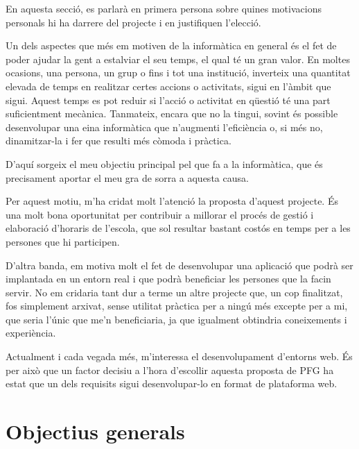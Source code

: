 \documentclass[a4paper,12pt]{ThesisStyle}
\begin{document}
En aquesta secció, es parlarà en primera persona sobre quines motivacions personals hi ha darrere del projecte i en justifiquen l'elecció.

Un dels aspectes que més em motiven de la informàtica en general és el fet de poder ajudar la gent a estalviar el seu temps, el qual té un gran valor. En moltes ocasions, una persona, un grup o fins i tot una institució, inverteix una quantitat elevada de temps en realitzar certes accions o activitats, sigui en l'àmbit que sigui. Aquest temps es pot reduir si l'acció o activitat en qüestió té una part suficientment mecànica. Tanmateix, encara que no la tingui, sovint és possible desenvolupar una eina informàtica que n'augmenti l'eficiència o, si més no, dinamitzar-la i fer que resulti més còmoda i pràctica.

D'aquí sorgeix el meu objectiu principal pel que fa a la informàtica, que és precisament aportar el meu gra de sorra a aquesta causa.

Per aquest motiu, m'ha cridat molt l'atenció la proposta d'aquest projecte. És una molt bona oportunitat per contribuir a millorar el procés de gestió i elaboració d'horaris de l'escola, que sol resultar bastant costós en temps per a les persones que hi participen.

D'altra banda, em motiva molt el fet de desenvolupar una aplicació que podrà ser implantada en un entorn real i que podrà beneficiar les persones que la facin servir. No em cridaria tant dur a terme un altre projecte que, un cop finalitzat, fos simplement arxivat, sense utilitat pràctica per a ningú més excepte per a mi, que seria l'únic que me'n beneficiaria, ja que igualment obtindria coneixements i experiència.

Actualment i cada vegada més, m'interessa el desenvolupament d'entorns web. És per això que un factor decisiu a l'hora d'escollir aquesta proposta de PFG ha estat que un dels requisits sigui desenvolupar-lo en format de plataforma web.

\section{Objectius generals}
\label{sec:objectius_generals}
\end{document}
